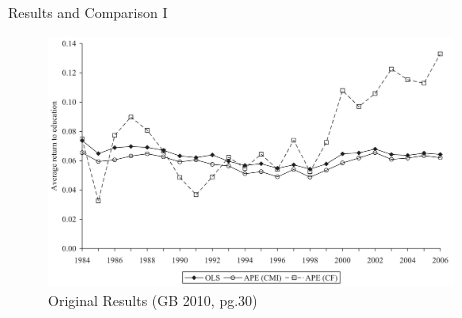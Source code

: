 \documentclass[10pt,ignorenonframetext,]{beamer}
\begin{document}
\begin{frame}{Results and Comparison I}
\protect\hypertarget{results-and-comparison-i}{}

\begin{figure}
\centering
\includegraphics[width=\textwidth,height=2.60417in]{img/OLS_CMI_CF_GB2010.png}
\caption{Original Results (GB 2010, pg.30)}
\end{figure}

\end{frame}
\end{document}
